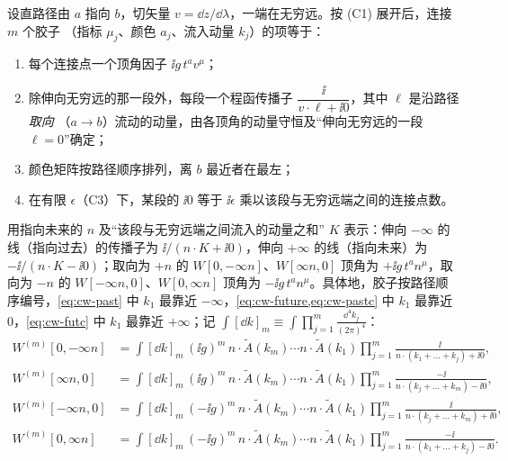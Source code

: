 \begin{proposition}\tagR\label{prop:cw-rules}
设直路径由 $a$ 指向 $b$，切矢量 $v=\dd z/\dd\lambda$，一端在无穷远。按 (C1) 展开后，连接 $m$ 个胶子
（指标 $\mu_j$、颜色 $a_j$、流入动量 $k_j$）的项等于：
\begin{enumerate}[label=(\roman*)]
\item 每个连接点一个顶角因子 $\ii g\,t^{a}v^{\mu}$；
\item 除伸向无穷远的那一段外，每段一个程函传播子 $\dfrac{\ii}{v\cdot\ell+\ii0}$，其中 $\ell$ 是沿路径\emph{取向}
      （$a\to b$）流动的动量，由各顶角的动量守恒及“伸向无穷远的一段 $\ell=0$”确定；
\item 颜色矩阵按路径顺序排列，离 $b$ 最近者在最左；
\item 在有限 $\epsilon$（C3）下，某段的 $\ii0$ 等于 $\ii\epsilon$ 乘以该段与无穷远端之间的连接点数。
\end{enumerate}
用指向未来的 $n$ 及“该段与无穷远端之间流入的动量之和” $K$ 表示：伸向 $-\infty$ 的线（指向过去）的传播子为
$\ii/(n\cdot K+\ii0)$，伸向 $+\infty$ 的线（指向未来）为 $-\ii/(n\cdot K-\ii0)$；取向为 $+n$ 的
$W[0,-\infty n]$、$W[\infty n,0]$ 顶角为 $+\ii g\,t^an^\mu$，取向为 $-n$ 的 $W[-\infty n,0]$、$W[0,\infty n]$ 顶角为
$-\ii g\,t^an^\mu$。具体地，胶子按路径顺序编号，\cref{eq:cw-past} 中 $k_1$ 最靠近 $-\infty$，\cref{eq:cw-future,eq:cw-pastc} 中 $k_1$
最靠近 $0$，\cref{eq:cw-futc} 中 $k_1$ 最靠近 $+\infty$；记 $\int[\dd k]_m\equiv\int\prod_{j=1}^m\frac{\dd^4k_j}{(2\pi)^4}$：
\begin{align}
W^{(m)}[0,-\infty n]&=\int[\dd k]_m\,
(\ii g)^m\,n\cdot\tilde A(k_m)\cdots n\cdot\tilde A(k_1)
\prod_{j=1}^m\frac{\ii}{n\cdot(k_1+\dots+k_j)+\ii0},\label{eq:cw-past}\\
W^{(m)}[\infty n,0]&=\int[\dd k]_m\,
(\ii g)^m\,n\cdot\tilde A(k_m)\cdots n\cdot\tilde A(k_1)
\prod_{j=1}^m\frac{-\ii}{n\cdot(k_j+\dots+k_m)-\ii0},\label{eq:cw-future}\\
W^{(m)}[-\infty n,0]&=\int[\dd k]_m\,
(-\ii g)^m\,n\cdot\tilde A(k_m)\cdots n\cdot\tilde A(k_1)
\prod_{j=1}^m\frac{\ii}{n\cdot(k_j+\dots+k_m)+\ii0},\label{eq:cw-pastc}\\
W^{(m)}[0,\infty n]&=\int[\dd k]_m\,
(-\ii g)^m\,n\cdot\tilde A(k_m)\cdots n\cdot\tilde A(k_1)
\prod_{j=1}^m\frac{-\ii}{n\cdot(k_1+\dots+k_j)-\ii0}.\label{eq:cw-futc}
\end{align}
\end{proposition}


